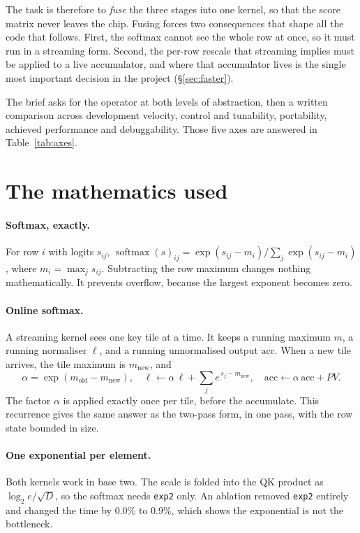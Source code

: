 \documentclass[10pt,a4paper]{article}
\begin{document}
The task is therefore to \emph{fuse} the three stages into one kernel, so that the score matrix never
leaves the chip. Fusing forces two consequences that shape all the code that follows. First, the
softmax cannot see the whole row at once, so it must run in a streaming form. Second, the per-row
rescale that streaming implies must be applied to a live accumulator, and where that accumulator lives
is the single most important decision in the project (\S\ref{sec:faster}).

The brief asks for the operator at both levels of abstraction, then a written comparison across
development velocity, control and tunability, portability, achieved performance and debuggability.
Those five axes are answered in Table~\ref{tab:axes}.

\section{The mathematics used}

\paragraph{Softmax, exactly.} For row $i$ with logits $s_{ij}$,
$\operatorname{softmax}(s)_{ij} = \exp(s_{ij} - m_i) / \sum_j \exp(s_{ij} - m_i)$, where
$m_i = \max_j s_{ij}$. Subtracting the row maximum changes nothing mathematically. It prevents
overflow, because the largest exponent becomes zero.

\paragraph{Online softmax.} A streaming kernel sees one key tile at a time. It keeps a running maximum
$m$, a running normaliser $\ell$, and a running unnormalised output $\mathrm{acc}$. When a new tile
arrives, the tile maximum is $m_{\text{new}}$, and
\begin{equation}
\alpha = \exp\!\left(m_{\text{old}} - m_{\text{new}}\right),\quad
\ell \leftarrow \alpha\,\ell + \sum_j e^{\,s_j - m_{\text{new}}},\quad
\mathrm{acc} \leftarrow \alpha\,\mathrm{acc} + P V .
\label{eq:online}
\end{equation}
The factor $\alpha$ is applied exactly once per tile, before the accumulate. This recurrence gives the
same answer as the two-pass form, in one pass, with the row state bounded in size.

\paragraph{One exponential per element.} Both kernels work in base two. The scale is folded into the
QK product as $\log_2 e/\sqrt{D}$, so the softmax needs \texttt{exp2} only. An ablation removed
\texttt{exp2} entirely and changed the time by 0.0\% to 0.9\%, which shows the exponential is not the
bottleneck.
\end{document}
